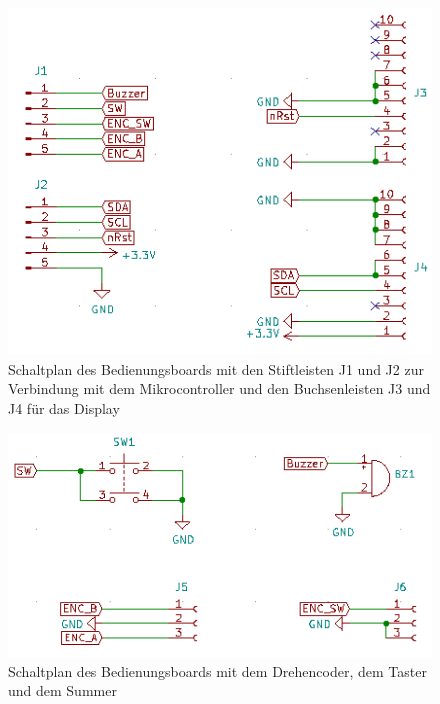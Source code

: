 \begin{figure}[H] %
\includegraphics[width=.75\textwidth]{sec6/images/Display_PCB} 
\centering
\captionsetup{width=.95\textwidth}
\caption[Schaltplan des Bedienungsboards 1]{Schaltplan des Bedienungsboards mit den Stiftleisten J1 und J2 zur Verbindung mit dem Mikrocontroller und den Buchsenleisten J3 und J4 für das Display}\centering
\label{fig:BedienungsBoard1}
\end{figure}

\begin{figure}[H] %
\includegraphics[width=.90\textwidth]{sec6/images/Display_PCB2} 
\centering
\captionsetup{width=.95\textwidth}
\caption[Schaltplan des Bedienungsboards 2]{Schaltplan des Bedienungsboards mit dem Drehencoder, dem Taster und dem Summer}\centering
\label{fig:BedienungsBoard2}
\end{figure}

